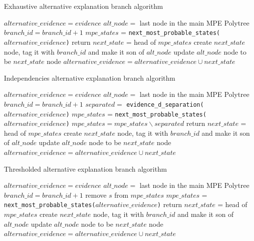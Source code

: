 \begin{algorithm}[htp!]
	\caption{Exhaustive alternative explanation branch algorithm}
	\label{alg:alternative-branch-exhaustive}
	\begin{algorithmic}[1]
		\State $alternative\_evidence = evidence$ 
		\State $alt\_node = $ last node in the main MPE Polytree
		\State $branch\_id = branch\_id + 1$
			\State $mpe\_states$ = \texttt{next\_most\_probable\_states($alternative\_evidence$)}
				\State return
			\Else
				\State $next\_state$ = head of $mpe\_states$ 
				\State create $next\_state$ node, tag it with $branch\_id$ and make it son of $alt\_node$
				\State update $alt\_node$ node to be $next\_state$ node
				\State $alternative\_evidence = alternative\_evidence \cup next\_state$
			\EndIf
		\EndWhile
	\end{algorithmic}
\end{algorithm}

\begin{algorithm}[htp!]
	\caption{Independencies alternative explanation branch algorithm}
	\label{alg:alternative-branch-independencies}
	\begin{algorithmic}[1]
		\State $alternative\_evidence = evidence$ 
		\State $alt\_node = $ last node in the main MPE Polytree
		\State $branch\_id = branch\_id + 1$
			\State $separated = $ \texttt{evidence\_d\_separation($alternative\_evidence$)}
			\State $mpe\_states$ = \texttt{next\_most\_probable\_states($alternative\_evidence$)}
			\State $mpe\_states = mpe\_states \smallsetminus separated$ 
				\State return
			\Else
				\State $next\_state$ = head of $mpe\_states$ 
				\State create $next\_state$ node, tag it with $branch\_id$ and make it son of $alt\_node$
				\State update $alt\_node$ node to be $next\_state$ node
				\State $alternative\_evidence = alternative\_evidence \cup next\_state$
			\EndIf
		\EndWhile
	\end{algorithmic}
\end{algorithm} 

\begin{algorithm}[htp!]
	\caption{Thresholded alternative explanation branch algorithm}
	\label{alg:alternative-branch-thresholded}
	\begin{algorithmic}[1]
		\State $alternative\_evidence = evidence$ 
		\State $alt\_node = $ last node in the main MPE Polytree
		\State $branch\_id = branch\_id + 1$
					\State remove $s$ from $mpe\_states$ 
				\EndIf
			\EndFor	
			\State $mpe\_states$ = \texttt{next\_most\_probable\_states($alternative\_evidence$)}
				\State return
			\Else
				\State $next\_state$ = head of $mpe\_states$ 
				\State create $next\_state$ node, tag it with $branch\_id$ and make it son of $alt\_node$
				\State update $alt\_node$ node to be $next\_state$ node
				\State $alternative\_evidence = alternative\_evidence \cup next\_state$
			\EndIf
		\EndWhile
	\end{algorithmic}
\end{algorithm} 

